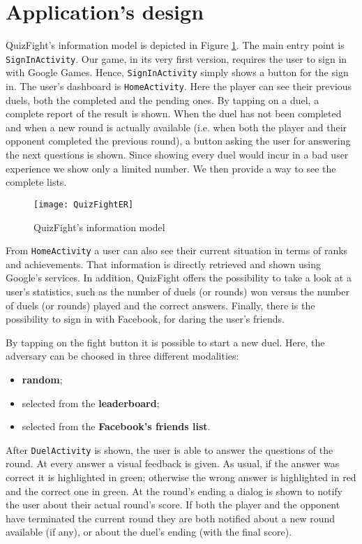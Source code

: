 \section{Application's design}
QuizFight's information model is depicted in Figure \ref{fig:quizfighter}.
The main entry point is \texttt{SignInActivity}.
Our game, in its very first version, requires the user to sign in with Google
Games. Hence, \texttt{SignInActivity} simply shows a button for the sign in.
The user's dashboard is \texttt{HomeActivity}.
Here the player can see their previous duels, both the completed and the
pending ones.
By tapping on a duel, a complete report of the result is shown.
When the duel has not been completed and when a new round is actually
available (i.e. when both the player and their opponent completed the
previous round), a button asking the user for answering the next questions
is shown.
Since showing every duel would incur in a bad user experience we show
only a limited number. We then provide a way to see the complete lists.

\begin{figure}[t]
	\centering
	\texttt{[image: QuizFightER]}
	\caption{QuizFight's information model}
	\label{fig:quizfighter}
\end{figure}

From \texttt{HomeActivity} a user can also see their current situation in terms
of ranks and achievements.
That information is directly retrieved and shown using Google's services.
In addition, QuizFight offers the possibility to take a look at a user's
statistics, such as the number of duels (or rounds) won versus the number of
duels (or rounds) played and the correct answers.
Finally, there is the possibility to sign in with Facebook, for daring the
user's friends.

By tapping on the fight button it is possible to start a new duel.
Here, the adversary can be choosed in three different modalities:

\begin{itemize}
	\item \textbf{random};
	\item selected from the \textbf{leaderboard};
	\item selected from the \textbf{Facebook's friends list}.
\end{itemize}

After \texttt{DuelActivity} is shown, the user is able to answer the
questions of the round. At every answer a visual feedback is given.
As usual, if the answer was correct it is highlighted in green; otherwise the
wrong answer is highlighted in red and the correct one in green.
At the round's ending a dialog is shown to notify the user about their
actual round's score. If both the player and the opponent have terminated
the current round they are both notified about a new round available (if any),
or about the duel's ending (with the final score). 
